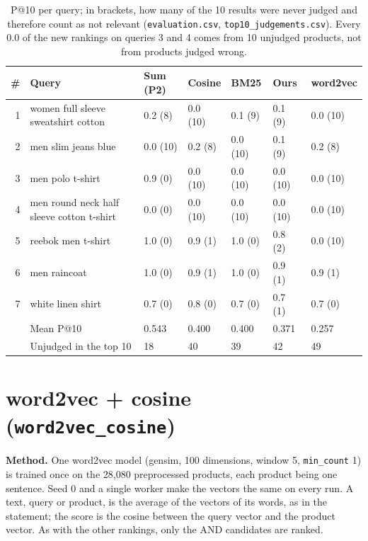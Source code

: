 \documentclass[10pt,a4paper]{article}
\newcommand{\file}[1]{\texttt{\small #1}}
\begin{document}
\begin{table}[H]
\centering\small
\begin{tabular}{r l l l l l l}
\toprule
\# & Query & Sum (P2) & Cosine & BM25 & Ours & word2vec \\
\midrule
1 & women full sleeve sweatshirt cotton & 0.2 (8) & 0.0 (10) & 0.1 (9) & 0.1 (9) & 0.0 (10) \\
2 & men slim jeans blue                 & 0.0 (10) & 0.2 (8) & 0.0 (10) & 0.1 (9) & 0.2 (8) \\
3 & men polo t-shirt                    & 0.9 (0) & 0.0 (10) & 0.0 (10) & 0.0 (10) & 0.0 (10) \\
4 & men round neck half sleeve cotton t-shirt & 0.0 (0) & 0.0 (10) & 0.0 (10) & 0.0 (10) & 0.0 (10) \\
5 & reebok men t-shirt                  & 1.0 (0) & 0.9 (1) & 1.0 (0) & 0.8 (2) & 0.0 (10) \\
6 & men raincoat                        & 1.0 (0) & 0.9 (1) & 1.0 (0) & 0.9 (1) & 0.9 (1) \\
7 & white linen shirt                   & 0.7 (0) & 0.8 (0) & 0.7 (0) & 0.7 (1) & 0.7 (0) \\
\midrule
 & Mean P@10 & 0.543 & 0.400 & 0.400 & 0.371 & 0.257 \\
 & Unjudged in the top 10 & 18 & 40 & 39 & 42 & 49 \\
\bottomrule
\end{tabular}
\caption{P@10 per query; in brackets, how many of the 10 results were never judged and therefore
count as not relevant (\file{evaluation.csv}, \file{top10\_judgements.csv}). Every 0.0 of the new
rankings on queries 3 and 4 comes from 10 unjudged products, not from products judged wrong.}
\label{tab:p10}
\end{table}

\section{word2vec + cosine (\file{word2vec\_cosine})}

\textbf{Method.} One word2vec model (gensim, 100 dimensions, window 5, \texttt{min\_count} 1) is trained
once on the 28,080 preprocessed products, each product being one sentence. Seed 0 and a single worker
make the vectors the same on every run. A text, query or product, is the average of the vectors of its
words, as in the statement; the score is the cosine between the query vector and the product vector.
As with the other rankings, only the AND candidates are ranked.
\end{document}

